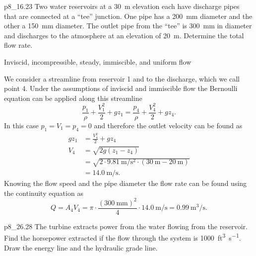 
\begin{problemwithimage}{p8_1}{6.23}
  Two water reservoirs at a \qty{30}{\m} elevation each have discharge pipes that are connected at a ``tee'' junction.
  One pipe has a \qty{200}{\mm} diameter and the other a \qty{150}{\mm} diameter.
  The outlet pipe from the ``tee'' is \qty{300}{\mm} in diameter and discharges to the atmosphere at an elevation of \qty{20}{\m}.
  Determine the total flow rate.
\end{problemwithimage}

\begin{assumptions}
  \item Inviscid, incompressible, steady, immiscible, and uniform flow
\end{assumptions}

\begin{derivation}
  We consider a streamline from reservoir 1 and to the discharge, which we call point 4. Under the assumptions of inviscid and immiscible flow the Bernoulli equation can be applied along this streamline
  \[ 
  \frac{p_1}{\rho} + \frac{V_1^2}{2} + gz_1 = \frac{p_4}{\rho} + \frac{V_4^2}{2} + gz_4
  .\]
  In this case $p_1 = V_1 = p_4 = 0$ and therefore the outlet velocity can be found as
  \begin{align*}
    gz_1 &= \frac{V_4^2}{2} + gz_4 \\
    V_4 &= \sqrt{2g \left( z_1 - z_4 \right)} \\
    &= \sqrt{2 \cdot \qty{9,81}{\m\per\square\s} \cdot \left( \qty{30}{\m} - \qty{20}{\m} \right)} \\
    &= \qty{14,0}{\m\per\s} 
  .\end{align*}
  Knowing the flow speed and the pipe diameter the flow rate can be found using the continuity equation as
  \[ 
  Q = A_4 V_4 = \pi \cdot \frac{\left( \qty{300}{\mm}  \right)^2}{4} \cdot \qty{14,0}{\m\per\s} = \qty{0,99}{\cubic\m\per\s} 
  .\]
\end{derivation}


\begin{problemwithimage}{p8_2}{6.28}
  The turbine extracts power from the water flowing from the reservoir.
  Find the horsepower extracted if the flow through the system is \qty{1000}{ft^3\per\s}.
  Draw the energy line and the hydraulic grade line.
\end{problemwithimage}

